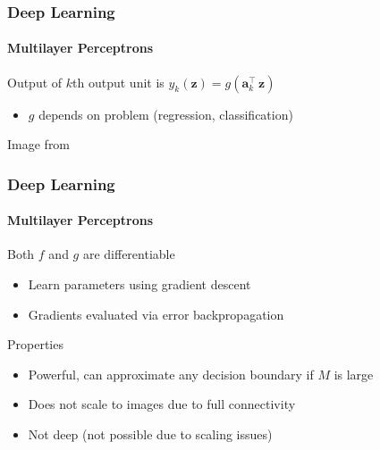 \documentclass[xetex,professionalfont]{beamer}
\renewcommand{\vec}[1]{\ensuremath{\mathbf{#1}}}
\newcommand{\va}{\vec{a}}
\newcommand{\vz}{\vec{z}}
\begin{document}

\begin{frame}
\frametitle{Deep Learning}
\framesubtitle{Multilayer Perceptrons}

Output of $k$th output unit is $y_k(\vz)=g(\va_k^\top\,\vz)$ %
\begin{itemize}
    \item $g$ depends on problem (regression, classification) %
\end{itemize}

\bigskip
\begin{center}
    {\centering Image from \cite{bishop2006}}
\end{center}

\end{frame}


\begin{frame}
\frametitle{Deep Learning}
\framesubtitle{Multilayer Perceptrons}

Both $f$ and $g$ are differentiable
\begin{itemize}
    \item Learn parameters using gradient descent %
    \item Gradients evaluated via error backpropagation %
\end{itemize}

\bigskip
Properties
\begin{itemize}
    \item Powerful, can approximate any decision boundary if $M$ is large
    \item Does not scale to images due to full connectivity
    \item Not deep (not possible due to scaling issues)
\end{itemize}

\end{frame}
\end{document}
